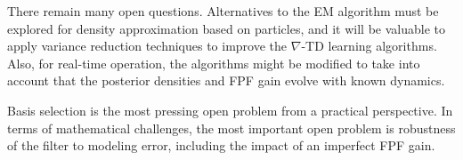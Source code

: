 There remain many open questions.   Alternatives to the EM algorithm must be explored for density approximation based on particles,  and it will be valuable to apply variance reduction techniques to improve the $\nabla$-TD learning algorithms.  Also, for real-time operation, the algorithms might be modified to take into account that the posterior densities and FPF gain evolve with known dynamics.  

Basis selection is the most pressing open problem from a practical perspective.  In terms of mathematical challenges, the most important open problem is robustness of the filter to modeling error, including the impact of an imperfect FPF gain.

